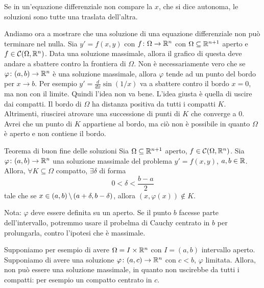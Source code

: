 \documentclass[a4paper]{article}
\begin{document}
Se in un'equazione differenziale non compare la \(x\),
che si dice autonoma, le soluzioni sono tutte una traslata dell'altra.


Andiamo ora a mostrare che una soluzione di una equazione differenziale non può terminare nel nulla.
Sia \(y' = f(x,y)\) con \(f \colon \Omega \to \mathbb{R}^n\)
con \(\Omega \subseteq \mathbb{R}^{n+1}\) aperto e \(f\in \mathcal C(\Omega, \mathbb{R}^n)\).
Data una soluzione massimale, allora il grafico di questa deve andare a sbattere contro
la frontiera di \(\Omega\).
Non è necessariamente vero che se \(\varphi \colon (a,b) \to \mathbb{R}^n\)
è una soluzione massimale, allora \(\varphi\) tende ad un punto del bordo per \(x \to b\).
Per esempio \(y' = \frac{d}{dx} \sin(1/x)\) va a sbattere contro il bordo \(x=0\),
ma non con il limite. Quindi l'idea non va bene.
L'idea giusta è quella di uscire dai compatti.
Il bordo di \(\Omega\) ha distanza positiva da tutti i compatti \(K\).
Altrimenti, riuscirei  atrovare una successione di punti di \(K\) che converge a \(0\).
Avrei che un punto di \(K\) appartiene al bordo, ma ciò non è possibile in quanto \(\Omega\)
è aperto e non contiene il bordo.

\begin{snippettheorem}{Teorema di buon fine delle soluzioni}
    Sia \(\Omega \subseteq \mathbb{R}^{n+1}\) aperto,
    \(f \in \mathcal C(\Omega, \mathbb{R}^n)\).
    Sia \(\varphi \colon (a,b) \to \mathbb{R}^n\)
    una soluzione massimale del problema \(y'=f(x,y)\),
    \(a,b\in \mathbb{R}\).
    Allora, \(\forall K \subseteq \Omega\) compatto, \(\exists \delta\)
    di forma \[  0 < \delta < \frac{b-a}{2} \]
    tale che se \(x\in (a,b) \,\backslash\, (a + \delta, b - \delta)\),
    allora \((x, \varphi(x)) \notin K\).
\end{snippettheorem}

Nota: \(\varphi\) deve essere definita su un aperto. Se il punto \(b\)
facesse parte dell'intervallo, potremmo usare il probelma di Cauchy centrato in \(b\)
per prolungarla, contro l'ipotesi che è massimale.

Supponiamo per esempio di avere \(\Omega = I \times \mathbb{R}^n\)
con \(I = (a,b)\) intervallo aperto.
Supponiamo di avere una soluzione \(\varphi \colon (a,c) \to \mathbb{R}^n\)
con \(c < b\), \(\varphi\) limitata. Allora, non può essere una soluzione massimale,
in quanto non uscirebbe da tutti i compatti: per esempio un compatto centrato in \(c\).
\end{document}
